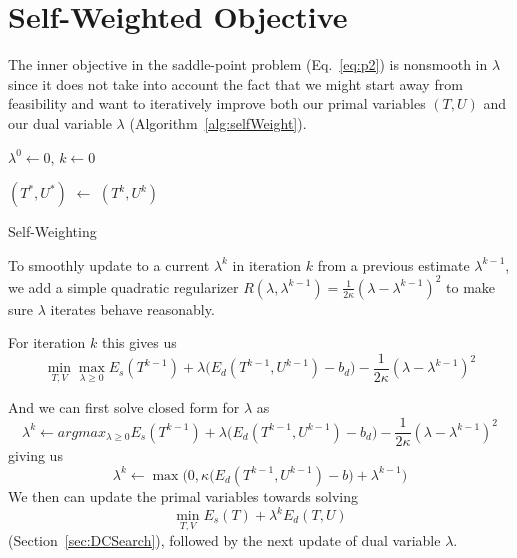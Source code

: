 
\section{Self-Weighted Objective}
\label{sec:self_weighting}


The inner objective in the saddle-point problem (Eq.~\ref{eq:p2}) is nonsmooth in $\lambda$ since it does not take into account the fact that we might start away from feasibility and want to iteratively improve both our primal variables $(T, U)$ and our dual variable $\lambda$ (Algorithm~\ref{alg:selfWeight}).

\begin{algorithm}[!h]
\SetAlgoLined
{}

$\lambda^0 \leftarrow 0$, $k \leftarrow 0$\;

$(T^*, U^*)$ $\leftarrow$ $(T^k, U^k)$\; 

\caption{Self-Weighting}
\label{alg:selfWeight}
\end{algorithm}

To smoothly update to a current $\lambda^{k}$ in iteration $k$ from a previous estimate $\lambda^{k-1}$, we add a simple quadratic regularizer $R(\lambda,\lambda^{k-1}) = \frac{1}{2\kappa} (\lambda- \lambda^{k-1})^2$ to make sure $\lambda$ iterates behave reasonably.

For iteration $k$ this gives us 
\[ \min_{T,V} \max_{\lambda \geq 0} E_{s}(T^{k-1}) + \lambda \big( E_{d}(T^{k-1}, U^{k-1}) - b_d\big) - \frac{1}{2\kappa} (\lambda- \lambda^{k-1})^2 \]

And we can first solve closed form for $\lambda$ as 
\[ \lambda^{k} \leftarrow argmax_{\lambda \geq 0} E_{s}(T^{k-1}) + \lambda \big( E_{d}(T^{k-1}, U^{k-1}) - b_d\big) - \frac{1}{2\kappa} (\lambda- \lambda^{k-1})^2 \]
giving us 
\[ \lambda^{k} \leftarrow \max\big(0,\kappa \big( E_{d}(T^{k-1}, U^{k-1}) -b \big) + \lambda^{k-1}\big) \]
We then can update the primal variables towards solving
\[ \min_{T,V}  E_{s}(T) + \lambda^{k}  E_{d}(T, U) \]
(Section~\ref{sec:DCSearch}), followed by the next update of dual variable $\lambda$.

